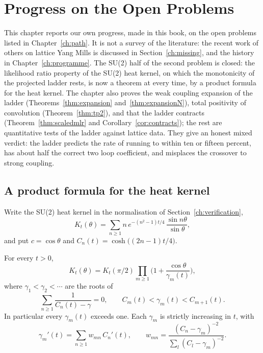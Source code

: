 \chapter{Progress on the Open Problems}\label{ch:progress}

This chapter reports our own progress, made in this book, on the open problems listed in Chapter~\ref{ch:path}. It is not a survey of the literature: the recent work of others on lattice Yang Mills is discussed in Section~\ref{ch:missing}, and the history in Chapter~\ref{ch:programme}. The SU(2) half of the second problem is closed: the likelihood ratio property of the SU(2) heat kernel, on which the monotonicity of the projected ladder rests, is now a theorem at every time, by a product formula for the heat kernel. The chapter also proves the weak coupling expansion of the ladder (Theorems~\ref{thm:expansion} and~\ref{thm:expansionN}), total positivity of convolution (Theorem~\ref{thm:tp2}), and that the ladder contracts (Theorem~\ref{thm:scaledmlr} and Corollary~\ref{cor:contracts}); the rest are quantitative tests of the ladder against lattice data. They give an honest mixed verdict: the ladder predicts the rate of running to within ten or fifteen percent, has about half the correct two loop coefficient, and misplaces the crossover to strong coupling.

\section{A product formula for the heat kernel}

Write the SU(2) heat kernel in the normalisation of Section~\ref{ch:verification},
\[
K_t(\theta)=\sum_{n\ge1}n\,e^{-(n^2-1)t/4}\,\frac{\sin n\theta}{\sin\theta},
\]
and put $c=\cos\theta$ and $C_n(t)=\cosh\big((2n-1)t/4\big)$.

\begin{theorem}\label{thm:product}
For every $t>0$,
\[
K_t(\theta)=K_t(\pi/2)\prod_{m\ge1}\Big(1+\frac{\cos\theta}{\gamma_m(t)}\Big),
\]
where $\gamma_1<\gamma_2<\cdots$ are the roots of
\[
\sum_{n\ge1}\frac{1}{C_n(t)-\gamma}=0,\qquad C_m(t)<\gamma_m(t)<C_{m+1}(t).
\]
In particular every $\gamma_m(t)$ exceeds one. Each $\gamma_m$ is strictly increasing in $t$, with
\[
\gamma_m'(t)=\sum_{n\ge1}w_{mn}\,C_n'(t),\qquad w_{mn}=\frac{(C_n-\gamma_m)^{-2}}{\sum_{l}(C_l-\gamma_m)^{-2}} .
\]
\end{theorem}

